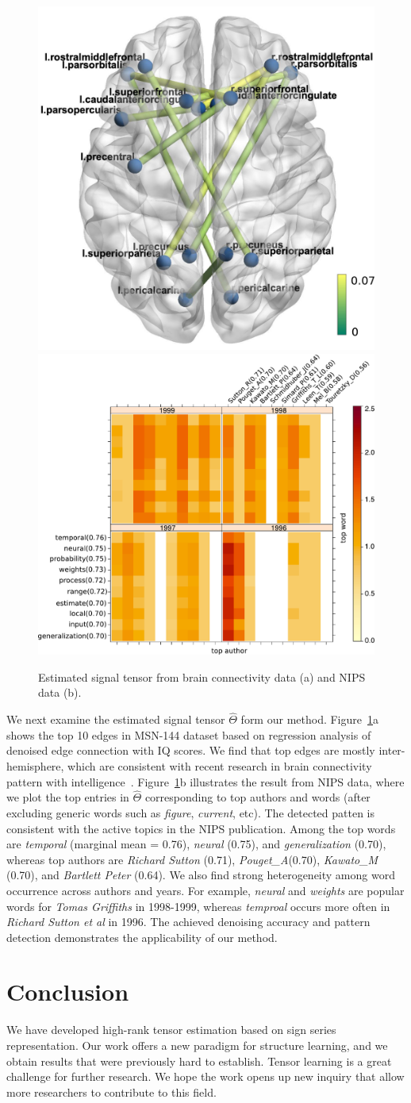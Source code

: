 \documentclass{article}
\theoremstyle{plain}
\theoremstyle{definition}
\begin{document}
\begin{figure}[h!]
\vspace{-.3cm}
\centering
\includegraphics[width=.2\textwidth]{figure/brainIQ.pdf}
\includegraphics[width=.27\textwidth]{figure/signal.pdf}
\caption{Estimated signal tensor from brain connectivity data (a) and NIPS data (b). %
}\label{fig:signal}
\vspace{-.3cm}
\end{figure}

We next examine the estimated signal tensor $\hat \Theta$ form our method. Figure~\ref{fig:signal}a shows the top 10 edges in MSN-144 dataset based on regression analysis of denoised edge connection with IQ scores. We find that top edges are mostly inter-hemisphere, which are consistent with recent research in brain connectivity pattern with intelligence~\cite{li2009brain,wang2017bayesian}. Figure~\ref{fig:signal}b illustrates the result from NIPS data, where we plot the top entries in $\hat \Theta$ corresponding to top authors and words (after excluding generic words such as \emph{figure}, \emph{current}, etc). The detected patten is consistent with the active topics in the NIPS publication. Among the top words are \emph{temporal} (marginal mean = 0.76), \emph{neural} (0.75), and \emph{generalization} (0.70), whereas top authors are \emph{Richard Sutton} (0.71), \emph{Pouget\_A}(0.70), \emph{Kawato\_M} (0.70), and \emph{Bartlett Peter} (0.64). We also find strong heterogeneity among word occurrence across authors and years. For example, \emph{neural} and \emph{weights} are popular words for \emph{Tomas Griffiths} in 1998-1999, whereas \emph{temproal} occurs more often in \emph{Richard Sutton et al} in 1996. The achieved denoising accuracy and pattern detection demonstrates the applicability of our method.


\section{Conclusion}
We have developed high-rank tensor estimation based on sign series representation. Our work offers a new paradigm for structure learning, and we obtain results that were previously hard to establish. Tensor learning is a great challenge for further research. We hope the work opens up new inquiry that allow more researchers to contribute to this field.






\appendix
\end{document}
